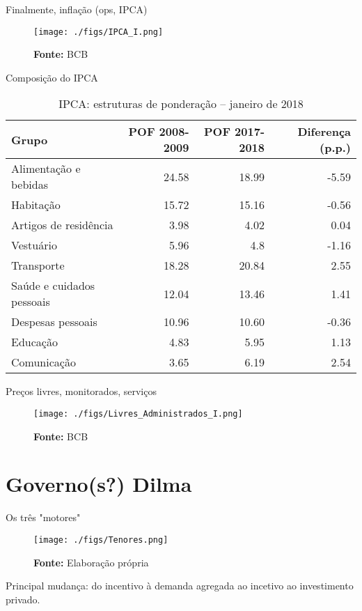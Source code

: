 \documentclass[presentation]{beamer}
\begin{document}
\begin{frame}[label={sec:org24e2c88}]{Finalmente, inflação (ops, IPCA)}
\begin{figure}[htb]
\centering
\caption{IPCA e Metas para Inflação} 
\texttt{[image: ./figs/IPCA\_I.png]}
\label{fig:IPCA}
\caption*{\textbf{Fonte:} BCB}
\end{figure}
\end{frame}
\begin{frame}[label={sec:org34db6da}]{Composição do IPCA \cite{bcb_2019_Atualizacoes}}
\begin{table}[htbp]
\caption{IPCA: estruturas de ponderação – janeiro de 2018}
\centering
\begin{tabular}{lrrr}
\hline
Grupo & POF 2008-2009 & POF 2017-2018 & Diferença (p.p.)\\
\hline
Alimentação e bebidas & 24.58 & 18.99 & -5.59\\
Habitação & 15.72 & 15.16 & -0.56\\
Artigos de residência & 3.98 & 4.02 & 0.04\\
Vestuário & 5.96 & 4.8 & -1.16\\
Transporte & 18.28 & 20.84 & 2.55\\
Saúde e cuidados pessoais & 12.04 & 13.46 & 1.41\\
Despesas pessoais & 10.96 & 10.60 & -0.36\\
Educação & 4.83 & 5.95 & 1.13\\
Comunicação & 3.65 & 6.19 & 2.54\\
\hline
\end{tabular}
\end{table}
\end{frame}
\begin{frame}[label={sec:org0b5621e}]{Preços livres, monitorados, serviços}
\begin{figure}[htb]
\centering
\caption{IPCA e seus componentes: preços livres, monitorados e serviços} 
\texttt{[image: ./figs/Livres\_Administrados\_I.png]}
\label{fig:livres_adm}
\caption*{\textbf{Fonte:} BCB}
\end{figure}
\end{frame}


\section{Governo(s?) Dilma}
\label{sec:orgb533564}

\begin{frame}[label={sec:org8278899}]{Os três "motores" \cite{serrano_demanda_2015}}
\begin{figure}[htb]
\centering
\caption{Os três motores do crescimento} 
\texttt{[image: ./figs/Tenores.png]}
\label{fig:tenores}
\caption*{\textbf{Fonte:} Elaboração própria}
\end{figure}

\alert{Principal mudança:} do incentivo à demanda agregada ao incetivo ao investimento privado.
\end{frame}
\end{document}
